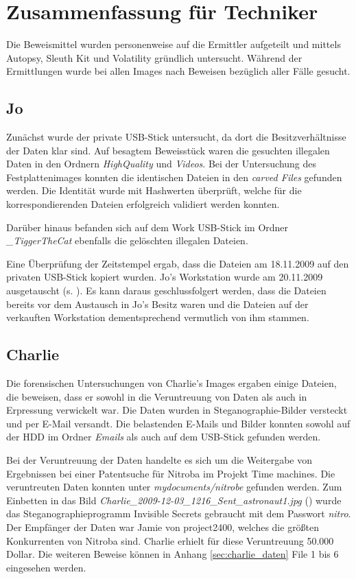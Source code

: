 \chapter{Zusammenfassung für Techniker}
\label{sec:tec}




Die Beweismittel wurden personenweise auf die Ermittler aufgeteilt und mittels Autopsy, Sleuth Kit und Volatility gründlich untersucht. Während der Ermittlungen wurde bei allen Images nach Beweisen bezüglich aller Fälle gesucht.

\section{Jo}
\label{sec:jo}
Zunächst wurde der private USB-Stick untersucht, da dort die Besitzverhältnisse der Daten klar sind. Auf besagtem Beweisstück waren die gesuchten illegalen Daten in den Ordnern \textit{HighQuality} und \textit{Videos}. Bei der Untersuchung des Festplattenimages konnten die identischen Dateien in den \textit{carved Files} gefunden werden. Die Identität wurde mit Hashwerten überprüft, welche für die korrespondierenden Dateien erfolgreich validiert werden konnten. 

Darüber hinaus befanden sich auf dem Work USB-Stick im Ordner \textit{_TiggerTheCat} ebenfalls die gelöschten illegalen Dateien.

Eine Überprüfung der Zeitstempel ergab, dass die Dateien am 18.11.2009 auf den privaten USB-Stick kopiert wurden. Jo's Workstation wurde am 20.11.2009 ausgetauscht (s. ). Es kann daraus geschlussfolgert werden, dass die Dateien bereits vor dem Austausch in Jo's Besitz waren und die Dateien auf der verkauften Workstation  dementsprechend vermutlich von ihm stammen.

\section{Charlie}
\label{sec:charlie}
Die forensischen Untersuchungen von Charlie's Images ergaben einige Dateien, die beweisen, dass er sowohl in die Veruntreuung von Daten als auch in Erpressung verwickelt war. Die Daten wurden in Steganographie-Bilder versteckt und per E-Mail versandt. Die belastenden E-Mails und Bilder konnten sowohl auf der HDD im Ordner \textit{Emails} als auch auf dem USB-Stick gefunden werden. 

Bei der Veruntreuung der Daten handelte es sich um die Weitergabe von Ergebnissen bei einer Patentsuche für Nitroba im Projekt Time machines. Die veruntreuten Daten konnten unter \textit{mydocuments/nitrobe} gefunden werden. Zum Einbetten in das Bild \textit{Charlie_2009-12-03_1216_Sent_astronaut1.jpg} () wurde das Steganographieprogramm Invisible Secrets gebraucht mit dem Passwort \textit{nitro}. Der Empfänger der Daten war Jamie von project2400, welches die größten Konkurrenten von Nitroba sind. Charlie erhielt für diese Veruntreuung 50.000 Dollar. Die weiteren Beweise können in Anhang \ref{sec:charlie_daten} File 1 bis 6 eingesehen werden.

